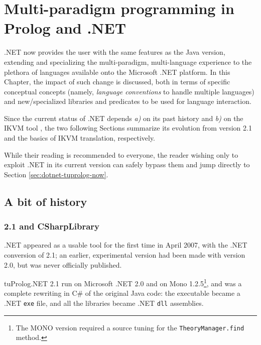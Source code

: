 \chapter{Multi-paradigm programming in Prolog and .NET}
\label{ch:mpp-in-dotnet}

\tuprolog{}.NET now provides the user with the same features as the Java version, extending and specializing the multi-paradigm, multi-language experience to the plethora of languages available onto the Microsoft .NET platform.
In this Chapter, the impact of such change is discussed, both in terms of specific conceptual concepts (namely, \textit{language conventions} to handle multiple languages) and new/specialized libraries and predicates to be used for language interaction.

Since the current status of \tuprolog{}.NET depends \textit{a)} on its past history and \textit{b)} on the IKVM tool \cite{ikvm}, the two following Sections summarize its evolution from version 2.1 and the basics of IKVM translation, respectively.

While their reading is recommended to everyone, the reader wishing only to exploit \tuprolog{}.NET in its current version can safely bypass them and jump directly to Section \ref{sec:dotnet-tuprolog-now}.

\section{A bit of history}
\label{sec:dotnet-tuprolog-history}

\subsection{\tuprolog{} 2.1 and CSharpLibrary}
\label{ssec:dotnet-tuprolog2.1}

\tuprolog{}.NET appeared as a usable tool for the first time in April 2007, with the .NET conversion of \tuprolog{} 2.1; an earlier, experimental version had been made with version 2.0, but was never officially published.

tuProlog.NET 2.1 run on Microsoft .NET 2.0 and on Mono 1.2.5\footnote{The MONO version required a source tuning for the \texttt{TheoryManager.find} method.}, and was a complete rewriting in C\# of the original Java code: the executable became a .NET \texttt{exe} file, and all the libraries became .NET \texttt{dll} assemblies.

